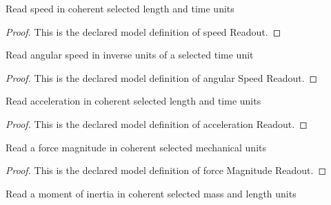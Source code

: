 \begin{definition}
  \label{def:physics:phyx-mini-0786:phyxminiproblems-problemphyxmini0786-speedreadout}
  Read speed in coherent selected length and time units
\end{definition}
\begin{proof}
  This is the declared model definition of speed Readout.
\end{proof}
\begin{definition}
  \label{def:physics:phyx-mini-0786:phyxminiproblems-problemphyxmini0786-angularspeedreadout}
  Read angular speed in inverse units of a selected time unit
\end{definition}
\begin{proof}
  This is the declared model definition of angular Speed Readout.
\end{proof}
\begin{definition}
  \label{def:physics:phyx-mini-0786:phyxminiproblems-problemphyxmini0786-accelerationreadout}
  Read acceleration in coherent selected length and time units
\end{definition}
\begin{proof}
  This is the declared model definition of acceleration Readout.
\end{proof}
\begin{definition}
  \label{def:physics:phyx-mini-0786:phyxminiproblems-problemphyxmini0786-forcemagnitudereadout}
  Read a force magnitude in coherent selected mechanical units
\end{definition}
\begin{proof}
  This is the declared model definition of force Magnitude Readout.
\end{proof}
\begin{definition}
  \label{def:physics:phyx-mini-0786:phyxminiproblems-problemphyxmini0786-momentofinertiareadout}
  Read a moment of inertia in coherent selected mass and length units
\end{definition}

